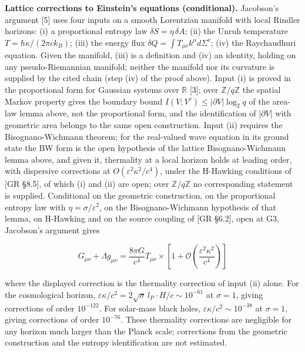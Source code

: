 \documentclass[
]{article}
\begin{document}
\textbf{Lattice corrections to Einstein's equations (conditional).}
Jacobson's argument {[}5{]} uses four inputs on a smooth Lorentzian
manifold with local Rindler horizons: (i) a proportional entropy law
\(\delta S = \eta\,\delta A\); (ii) the Unruh temperature
\(T = \hbar\kappa/(2\pi c k_B)\); (iii) the energy flux
\(\delta Q = \int T_{\mu\nu} k^\mu d\Sigma^\nu\); (iv) the Raychaudhuri
equation. Given the manifold, (iii) is a definition and (iv) an
identity, holding on any pseudo-Riemannian manifold; neither the
manifold nor its curvature is supplied by the cited chain (step (iv) of
the proof above). Input (i) is proved in the proportional form for
Gaussian systems over \(\mathbb{R}\) {[}3{]}; over
\(\mathbb{Z}/q\mathbb{Z}\) the spatial Markov property gives the
boundary bound \(I(V;V^c)\le|\partial V|\log_2 q\) of the area-law lemma
above, not the proportional form, and the identification of
\(|\partial V|\) with geometric area belongs to the same open
construction. Input (ii) requires the Bisognano-Wichmann theorem; for
the real-valued wave equation in its ground state the BW form is the
open hypothesis of the lattice Bisognano-Wichmann lemma above, and given
it, thermality at a local horizon holds at leading order, with
dispersive corrections at \(O(\varepsilon^2\kappa^2/c^4)\), under the
H-Hawking conditions of {[}GR §8.5{]}, of which (i) and (ii) are open;
over \(\mathbb{Z}/q\mathbb{Z}\) no corresponding statement is supplied.
Conditional on the geometric construction, on the proportional entropy
law with \(\eta = \sigma/\varepsilon^2\), on the Bisognano-Wichmann
hypothesis of that lemma, on H-Hawking and on the source coupling of
{[}GR §6.2{]}, open at G3, Jacobson's argument gives

\[G_{\mu\nu} + \Lambda g_{\mu\nu} = \frac{8\pi G}{c^4} T_{\mu\nu} \times \left[1 + \mathcal{O}\!\left(\frac{\varepsilon^2 \kappa^2}{c^4}\right)\right]\]

where the displayed correction is the thermality correction of input
(ii) alone. For the cosmological horizon,
\(\varepsilon\kappa/c^2 = 2\sqrt{\sigma}\,l_P \cdot H/c \sim 10^{-61}\)
at \(\sigma = 1\), giving corrections of order \(10^{-122}\). For
solar-mass black holes, \(\varepsilon\kappa/c^2 \sim 10^{-38}\) at
\(\sigma = 1\), giving corrections of order \(10^{-76}\). These
thermality corrections are negligible for any horizon much larger than
the Planck scale; corrections from the geometric construction and the
entropy identification are not estimated.
\end{document}
